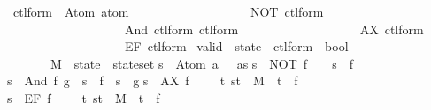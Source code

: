 %
\begin{isabellebody}%
\def\isabellecontext{PDL}%
%
\ ctl{\isacharunderscore}form\ {\isacharequal}\ Atom\ atom\isanewline
\ \ \ \ \ \ \ \ \ \ \ \ \ \ \ \ \ \ {\isacharbar}\ NOT\ ctl{\isacharunderscore}form\isanewline
\ \ \ \ \ \ \ \ \ \ \ \ \ \ \ \ \ \ {\isacharbar}\ And\ ctl{\isacharunderscore}form\ ctl{\isacharunderscore}form\isanewline
\ \ \ \ \ \ \ \ \ \ \ \ \ \ \ \ \ \ {\isacharbar}\ AX\ ctl{\isacharunderscore}form\isanewline
\ \ \ \ \ \ \ \ \ \ \ \ \ \ \ \ \ \ {\isacharbar}\ EF\ ctl{\isacharunderscore}form\isanewline
\isanewline
{}\ valid\ {\isacharcolon}{\isacharcolon}\ {\isachardoublequote}state\ {\isasymRightarrow}\ ctl{\isacharunderscore}form\ {\isasymRightarrow}\ bool{\isachardoublequote}\ {\isacharparenleft}{\isachardoublequote}{\isacharparenleft}{\isacharunderscore}\ {\isasymTurnstile}\ {\isacharunderscore}{\isacharparenright}{\isachardoublequote}\ {\isacharbrackleft}\ \isanewline
\ \ \ \ \ \ \ M\ {\isacharcolon}{\isacharcolon}\ {\isachardoublequote}{\isacharparenleft}state\ {\isasymtimes}\ state{\isacharparenright}set{\isachardoublequote}\isanewline
\isanewline
{}\isanewline
{\isachardoublequote}s\ {\isasymTurnstile}\ Atom\ a\ \ {\isacharequal}\ {\isacharparenleft}a{\isasymin}s{\isacharparenright}{\isachardoublequote}\isanewline
{\isachardoublequote}s\ {\isasymTurnstile}\ NOT\ f\ \ \ {\isacharequal}\ {\isacharparenleft}{\isasymnot}{\isacharparenleft}s\ {\isasymTurnstile}\ f{\isacharparenright}{\isacharparenright}{\isachardoublequote}\isanewline
{\isachardoublequote}s\ {\isasymTurnstile}\ And\ f\ g\ {\isacharequal}\ {\isacharparenleft}s\ {\isasymTurnstile}\ f\ {\isasymand}\ s\ {\isasymTurnstile}\ g{\isacharparenright}{\isachardoublequote}\isanewline
{\isachardoublequote}s\ {\isasymTurnstile}\ AX\ f\ \ \ \ {\isacharequal}\ {\isacharparenleft}{\isasymforall}t{\isachardot}\ {\isacharparenleft}s{\isacharcomma}t{\isacharparenright}\ {\isasymin}\ M\ {\isasymlongrightarrow}\ t\ {\isasymTurnstile}\ f{\isacharparenright}{\isachardoublequote}\isanewline
{\isachardoublequote}s\ {\isasymTurnstile}\ EF\ f\ \ \ \ {\isacharequal}\ {\isacharparenleft}{\isasymexists}t{\isachardot}\ {\isacharparenleft}s{\isacharcomma}t{\isacharparenright}\ {\isasymin}\ M{\isacharcircum}{\isacharasterisk}\ {\isasymand}\ t\ {\isasymTurnstile}\ f{\isacharparenright}{\isachardoublequote}\isanewline
\isanewline

\end{isabellebody}
